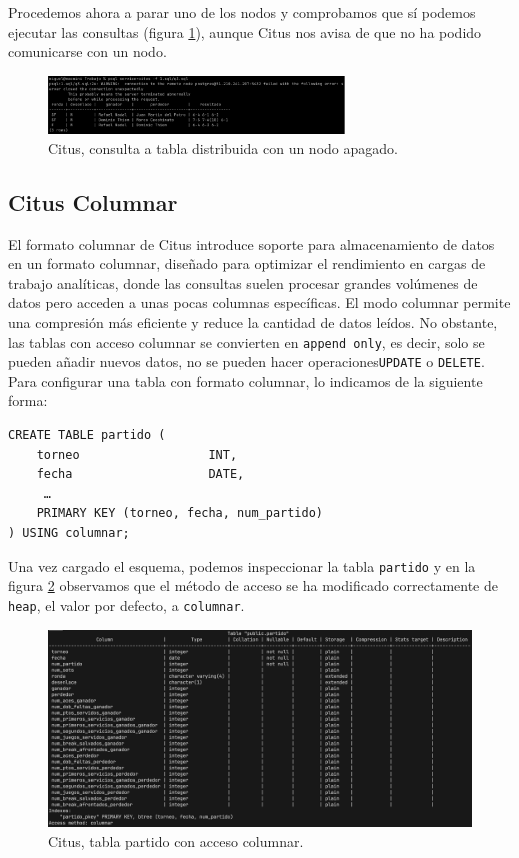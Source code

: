 Procedemos ahora a parar uno de los nodos y comprobamos que sí podemos ejecutar las consultas (figura \ref{fig:citus_shard_query}), aunque Citus nos avisa de que no ha podido comunicarse con un nodo.

\begin{figure}[H]
\centering
\includegraphics[width=0.7\textwidth]{fotos/citus/shard_consulta.png}
\caption{Citus, consulta a tabla distribuida con un nodo apagado.}
\label{fig:citus_shard_query}
\end{figure}

\subsection*{Citus Columnar}

El formato columnar de Citus introduce soporte para almacenamiento de datos en un formato columnar, diseñado para optimizar el rendimiento en cargas de trabajo analíticas, donde las consultas suelen procesar grandes volúmenes de datos pero acceden a unas pocas columnas específicas. El modo columnar permite una compresión más eficiente y reduce la cantidad de datos leídos. No obstante, las tablas con acceso columnar se convierten en \texttt{append only}, es decir, solo se pueden añadir nuevos datos, no se pueden hacer operaciones\texttt{UPDATE} o \texttt{DELETE}. \\

Para configurar una tabla con formato columnar, lo indicamos de la siguiente forma:

\begin{verbatim}
CREATE TABLE partido (
    torneo                  INT,
    fecha                   DATE,
     …
    PRIMARY KEY (torneo, fecha, num_partido)
) USING columnar;
\end{verbatim}


Una vez cargado el esquema, podemos inspeccionar la tabla \texttt{partido} y en la figura \ref{fig:citus_columnar} observamos que el método de acceso se ha modificado correctamente de \texttt{heap}, el valor por defecto, a \texttt{columnar}.

\begin{figure}[H]
\centering
\includegraphics[width=\textwidth]{fotos/citus/detalle_partido_columnar.png}
\caption{Citus, tabla partido con acceso columnar.}
\label{fig:citus_columnar}
\end{figure}
\newpage

